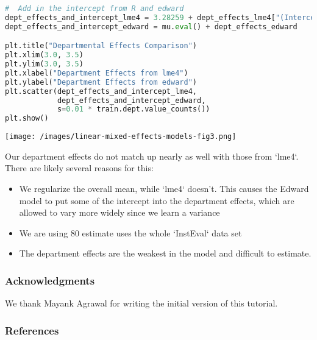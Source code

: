 \begin{lstlisting}[language=Python]
#  Add in the intercept from R and edward
dept_effects_and_intercept_lme4 = 3.28259 + dept_effects_lme4["(Intercept)"]
dept_effects_and_intercept_edward = mu.eval() + dept_effects_edward

plt.title("Departmental Effects Comparison")
plt.xlim(3.0, 3.5)
plt.ylim(3.0, 3.5)
plt.xlabel("Department Effects from lme4")
plt.ylabel("Department Effects from edward")
plt.scatter(dept_effects_and_intercept_lme4,
            dept_effects_and_intercept_edward,
            s=0.01 * train.dept.value_counts())
plt.show()
\end{lstlisting}

\texttt{[image: /images/linear-mixed-effects-models-fig3.png]}

Our department effects do not match up nearly as well with those from `lme4`.
There are likely several reasons for this:

\begin{itemize}
\item
  We regularize the overall mean, while `lme4` doesn't. This causes the
  Edward model to put some of the intercept into the department effects,
  which are allowed to vary more widely since we learn a variance
\item
  We are using 80%
  estimate uses the whole `InstEval` data set
\item
  The department effects are the weakest in the model and difficult to
  estimate.
\end{itemize}

\subsubsection{Acknowledgments}

We thank Mayank Agrawal for writing the initial version of this
tutorial.

\subsubsection{References}\label{references}
